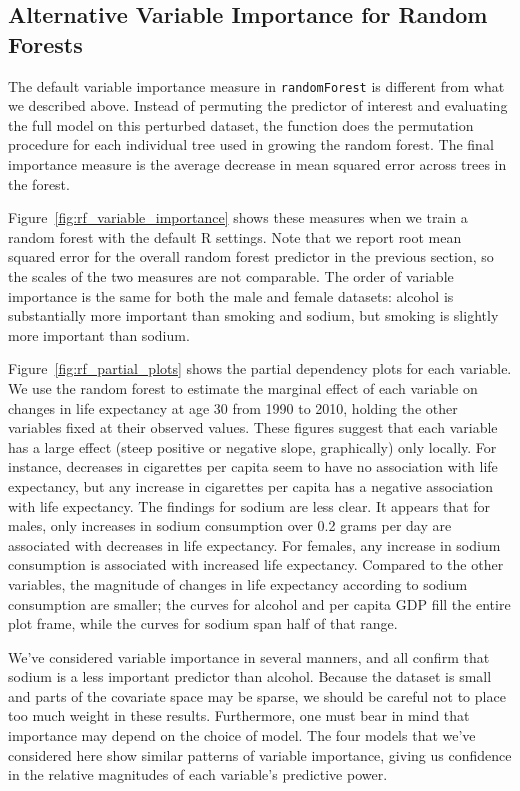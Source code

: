 \documentclass[11pt]{article}\usepackage[]{graphicx}\usepackage[]{color}
\begin{document}
\subsection{Alternative Variable Importance for Random Forests}
The default variable importance measure in \texttt{randomForest} is different from what we described above.
Instead of permuting the predictor of interest and evaluating the full model on this perturbed dataset, the function does the permutation procedure for each individual tree used in growing the random forest.
The final importance measure is the average decrease in mean squared error across trees in the forest.

Figure~\ref{fig:rf_variable_importance} shows these measures when we train a random forest with the default R settings.
Note that we report root mean squared error for the overall random forest predictor in the previous section, so the scales of the two measures are not comparable.
The order of variable importance is the same for both the male and female datasets: 
alcohol is substantially more important than smoking and sodium, but smoking is slightly more important than sodium.

Figure~\ref{fig:rf_partial_plots} shows the partial dependency plots for each variable.
We use the random forest to estimate the marginal effect of each variable on changes in life expectancy at age 30 from 1990 to 2010, 
holding the other variables fixed at their observed values.
These figures suggest that each variable has a large effect (steep positive or negative slope, graphically) only locally.
For instance, decreases in cigarettes per capita seem to have no association with life expectancy, but any increase in cigarettes per capita has a negative association with life expectancy.
The findings for sodium are less clear.
It appears that for males, only increases in sodium consumption over 0.2 grams per day are associated with decreases in life expectancy.
For females, any increase in sodium consumption is associated with increased life expectancy.
Compared to the other variables, the magnitude of changes in life expectancy according to sodium consumption are smaller; 
the curves for alcohol and per capita GDP fill the entire plot frame, while the curves for sodium span half of that range.

We've considered variable importance in several manners, and all confirm that sodium is a less important predictor than alcohol.
Because the dataset is small and parts of the covariate space may be sparse, we should be careful not to place too much weight in these results.
Furthermore, one must bear in mind that importance may depend on the choice of model.
The four models that we've considered here show similar patterns of variable importance, giving us confidence in the relative magnitudes of each variable's predictive power.
\end{document}
